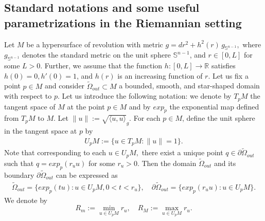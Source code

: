 \documentclass[12pt,reqno]{amsart}
\numberwithin{equation}{section}
\numberwithin{theorem}{section}
\numberwithin{equation}{section}
\numberwithin{theorem}{section}
\begin{document}
\subsection{Standard notations and some useful parametrizations in the Riemannian setting}
Let $M$ be a hypersurface of revolution  with  metric 
   $g = dr^2 + h^2(r)\, g_{\mathbb{S}^{n-1}},$
where $g_{\mathbb{S}^{n-1}}$ denotes the standard metric on the unit sphere 
$\mathbb{S}^{n-1}$, and $r \in [0, L]$ for some $L > 0$. 
Further, we assume that the function $h:[0,L]\to\mathbb{R}$ satisfies $h(0) = 0,  h'(0) = 1$, and $h(r)$ is an increasing function of $r.$
Let us fix a point $p\in  M$ and consider  $\tilde{\Omega}_{out} \subset M$  a bounded, smooth, and star-shaped domain with respect to  $p$. Let us introduce the following notation: we denote by $T_pM$ the tangent space of $M$  at the point $p\in M$ and by $exp_p$ the exponential map defined from $T_pM$ to $M$.
Let $\|u\| := \sqrt{\langle u, u\rangle}_g$. For each $p \in M$, define the unit sphere in the tangent space at $p$ by
\begin{align*}
    U_pM:=\{u\in T_pM: \|u\|=1\}.
\end{align*}
Note that corresponding to each $u \in U_pM,$ there exist a unique point $q\in \partial \tilde{\Omega}_{out}$ such that $q=exp_p(r_uu)$ for some $r_u>0.$ Then the domain $\tilde{\Omega}_{out}$ and its boundary $\partial\tilde{\Omega}_{out}$ can be expressed as 
 \begin{align*}
     \tilde{\Omega}_{out}=\{exp_p(tu): u\in U_pM, 0<t<r_u\}, \quad \partial \tilde{\Omega}_{out}= \{exp_p(r_uu):u\in U_pM\}.
 \end{align*}
We denote by
\begin{equation}\label{inradius}
    \displaystyle R_{m} := \min_{u \in U_{p}
M}r_u, \quad\displaystyle R_{M} := \max_{u \in U_{p}M} r_u .
\end{equation}
\end{document}

